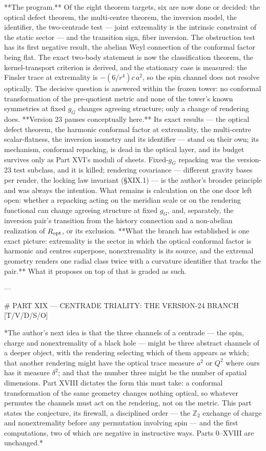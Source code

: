 **The program.** Of the eight theorem targets, six are now done or decided: the optical defect theorem, the multi-centre theorem, the inversion model, the identifier, the two-centrade test — joint extremality is the intrinsic constraint of the static sector — and the transition sign, fiber inversion. The obstruction test has its first negative result, the abelian Weyl connection of the conformal factor being flat. The exact two-body statement is now the classification theorem, the kernel-transport criterion is derived, and the stationary case is measured: the Finsler trace at extremality is $-(6/r^4)c\,a^2$, so the spin channel does not resolve optically. The decisive question is answered within the frozen tower: no conformal transformation of the pre-quotient metric and none of the tower's known symmetries at fixed $g_G$ changes agreeing structure; only a change of rendering does. **Version 23 pauses conceptually here.** Its exact results — the optical defect theorem, the harmonic conformal factor at extremality, the multi-centre scalar-flatness, the inversion isometry and its identifier — stand on their own; its mechanism, conformal repacking, is dead in the optical layer, and its budget survives only as Part XVI's moduli of sheets. Fixed-$g_G$ repacking was the version-23 test subclass, and it is killed; rendering covariance — different gravity bases per render, the locking law invariant (§XIX.1) — is the author's broader principle and was always the intention. What remains is calculation on the one door left open: whether a repacking acting on the meridian scale or on the rendering functional can change agreeing structure at fixed $g_G$, and, separately, the inversion pair's transition from the history connection and a non-abelian realization of $R_{\rm opt}$, or its exclusion. **What the branch has established is one exact picture: extremality is the sector in which the optical conformal factor is harmonic and centres superpose, nonextremality is its source, and the extremal geometry renders one radial class twice with a curvature identifier that tracks the pair.** What it proposes on top of that is graded as such.

---

# PART XIX — CENTRADE TRIALITY: THE VERSION-24 BRANCH [T/V/D/S/O]

*The author's next idea is that the three channels of a centrade — the spin, charge and nonextremality of a black hole — might be three abstract channels of a deeper object, with the rendering selecting which of them appears as which; that another rendering might have the optical trace measure $a^2$ or $Q^2$ where ours has it measure $\delta^2$; and that the number three might be the number of spatial dimensions. Part XVIII dictates the form this must take: a conformal transformation of the same geometry changes nothing optical, so whatever permutes the channels must act on the rendering, not on the metric. This part states the conjecture, its firewall, a disciplined order — the $\mathbb Z_2$ exchange of charge and nonextremality before any permutation involving spin — and the first computations, two of which are negative in instructive ways. Parts 0–XVIII are unchanged.*

